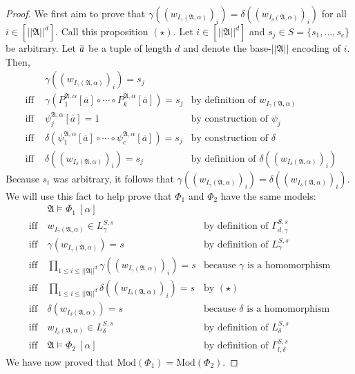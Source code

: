 \documentclass[a4paper,UKenglish,cleveref, autoref, thm-restate, anonymous]{lipics-v2021}
\begin{document}
\begin{proof}
    We first aim to prove that $\gamma((w_{I_\gamma(\mathfrak{A},\alpha)})_i) = \delta((w_{I_\delta(\mathfrak{A},\alpha)})_i)$ for all $i \in [||\mathfrak{A}||^d]$. Call this proposition $(\star)$. Let $i \in [||\mathfrak{A}||^d]$ and $s_j \in S = \{s_1, \dots, s_c\}$ be arbitrary. Let $\overline{a}$ be a tuple of length $d$ and denote the base-$||\mathfrak{A}||$ encoding of $i$. Then,
    \begin{align*}
        &\gamma((w_{I_\gamma(\mathfrak{A},\alpha)})_i) = s_j \\
        \text{ iff } &\gamma(P^{\mathfrak{A},\alpha}_1[\overline{a}] \circ \cdots \circ P^{\mathfrak{A},\alpha}_k[\overline{a}]) = s_j &\text{by definition of $w_{I_\gamma(\mathfrak{A},\alpha)}$}\\
        \text{ iff } &\psi^{\mathfrak{A},\alpha}_j[\overline{a}] = 1 &\text{by construction of $\psi_j$}\\
        \text{ iff } &\delta(\psi^{\mathfrak{A},\alpha}_1[\overline{a}] \circ \cdots \circ \psi^{\mathfrak{A},\alpha}_c[\overline{a}]) = s_j &\text{by construction of $\delta$}\\
        \text{ iff } &\delta((w_{I_\delta(\mathfrak{A},\alpha)})_i) = s_j &\text{by definition of $\delta((w_{I_\delta(\mathfrak{A},\alpha)})_i)$}
    \end{align*}
    Because $s_i$ was arbitrary, it follows that $\gamma((w_{I_\gamma(\mathfrak{A},\alpha)})_i) = \delta((w_{I_\delta(\mathfrak{A},\alpha)})_i)$.
    We will use this fact to help prove that $\Phi_1$ and $\Phi_2$ have the same models:
    \begin{align*}
        &\mathfrak{A} \models \Phi_1\ [\alpha]&\\
        \text{iff}\ &w_{I_\gamma(\mathfrak{A},\alpha)} \in L^{S,s}_\gamma &\text{by definition of $\Gamma^{S,s}_{d,\gamma}$}\\
        \text{iff}\ &\gamma(w_{I_\gamma(\mathfrak{A},\alpha)}) = s&\text{by definition of $L^{S,s}_\gamma$}\\
        \text{iff}\ &\prod_{1 \leq i \leq ||\mathfrak{A}||^d} \gamma((w_{I_\gamma(\mathfrak{A},\alpha)})_i) = s&\text{because $\gamma$ is a homomorphism}\\
        \text{iff}\ &\prod_{1 \leq i \leq ||\mathfrak{A}||^d} \delta((w_{I_\delta(\mathfrak{A},\alpha)})_i) = s&\text{by $(\star)$}\\
        \text{iff}\ &\delta(w_{I_\delta(\mathfrak{A},\alpha)}) = s&\text{because $\delta$ is a homomorphism}\\
        \text{iff}\ &w_{I_\delta(\mathfrak{A},\alpha)} \in L^{S,s}_\delta &\text{by definition of $L^{S,s}_\delta$}\\
        \text{iff}\ &\mathfrak{A} \models \Phi_2\ [\alpha]&\text{by definition of $\Gamma^{S,s}_{l,\delta}$}
    \end{align*}
    We have now proved that $\text{Mod}(\Phi_1) = \text{Mod}(\Phi_2)$.
\end{proof}
\end{document}
